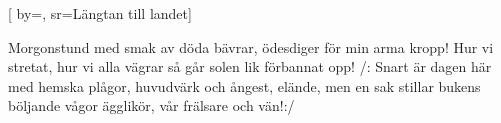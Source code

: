 [
    by={},
    sr={Längtan till landet}]

\beginverse
Morgonstund med smak av döda bävrar,
ödesdiger för min arma kropp!
Hur vi stretat, hur vi alla vägrar
så går solen lik förbannat opp!
/: Snart är dagen här med hemska plågor,
huvudvärk och ångest, elände, men
en sak stillar bukens böljande vågor
ägglikör, vår frälsare och vän!:/
\endverse

\vspace{5mm}
\endsong